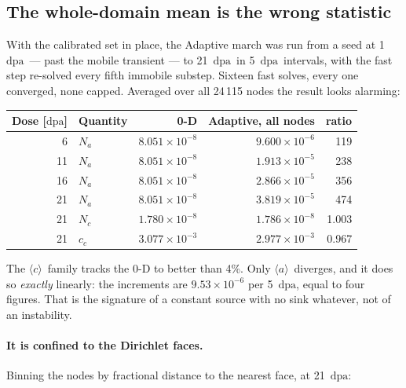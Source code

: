 \documentclass[11pt,a4paper]{article}
\newcommand{\dpa}{\ensuremath{\mathrm{dpa}}}
\newcommand{\aloop}{\ensuremath{\langle a\rangle}}
\newcommand{\cloop}{\ensuremath{\langle c\rangle}}
\begin{document}
\subsection{The whole-domain mean is the wrong statistic}
\label{sec:boundaryartifact}

With the calibrated set in place, the Adaptive march was run from a seed at
1~\dpa\ --- past the mobile transient --- to 21~\dpa\ in 5~\dpa\ intervals, with
the fast step re-solved every fifth immobile substep. Sixteen fast solves, every
one converged, none capped. Averaged over all 24\,115 nodes the result looks
alarming:

\begin{center}
\begin{tabular}{rlrrr}
\toprule
Dose [\dpa] & Quantity & 0-D & Adaptive, all nodes & ratio \\
\midrule
 6 & $N_a$ & $8.051\times10^{-8}$ & $9.600\times10^{-6}$ & 119 \\
11 & $N_a$ & $8.051\times10^{-8}$ & $1.913\times10^{-5}$ & 238 \\
16 & $N_a$ & $8.051\times10^{-8}$ & $2.866\times10^{-5}$ & 356 \\
21 & $N_a$ & $8.051\times10^{-8}$ & $3.819\times10^{-5}$ & 474 \\
\midrule
21 & $N_c$ & $1.780\times10^{-8}$ & $1.786\times10^{-8}$ & 1.003 \\
21 & $c_c$ & $3.077\times10^{-3}$ & $2.977\times10^{-3}$ & 0.967 \\
\bottomrule
\end{tabular}
\end{center}

\noindent
The \cloop\ family tracks the 0-D to better than 4\%. Only \aloop\ diverges, and
it does so \emph{exactly} linearly: the increments are $9.53\times10^{-6}$ per
5~\dpa, equal to four figures. That is the signature of a constant source with
no sink whatever, not of an instability.

\paragraph{It is confined to the Dirichlet faces.} Binning the nodes by
fractional distance to the nearest face, at 21~\dpa:
\end{document}

